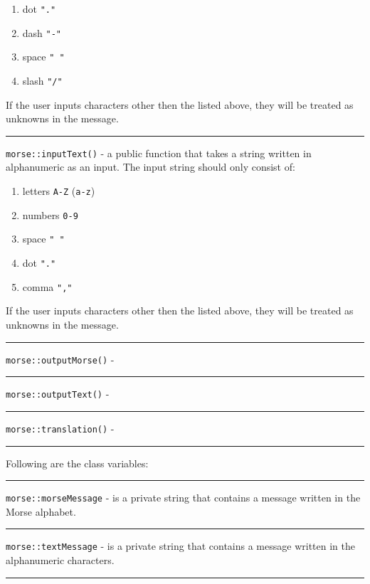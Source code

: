 \documentclass[12pt]{report}
\begin{document}
\begin{enumerate}
\item dot \verb|"."|

\item dash \verb|"-"|

\item space \verb|" "|

\item slash \verb|"/"|
\end{enumerate}

If the user inputs characters other then the listed above, they will be treated as unknowns in the message.

\rule{\textwidth}{0.5pt}


\verb|morse::inputText()| - a public function that takes a string written in alphanumeric as an input. The input string should only consist of:

\begin{enumerate}
\item letters \verb|A-Z| (\verb|a-z|)
\item numbers \verb|0-9|
\item space \verb|" "|
\item dot \verb|"."|
\item comma \verb|","|
\end{enumerate}

If the user inputs characters other then the listed above, they will be treated as unknowns in the message.

\rule{\textwidth}{0.5pt}

\verb|morse::outputMorse()| - 

\rule{\textwidth}{0.5pt}

\verb|morse::outputText()| - 

\rule{\textwidth}{0.5pt}

\verb|morse::translation()| - 

\rule{\textwidth}{0.5pt}



Following are the class variables:

\rule{\textwidth}{0.5pt}

\verb|morse::morseMessage| - is a private string that contains a message written in the Morse alphabet.

\rule{\textwidth}{0.5pt}

\verb|morse::textMessage| - is a private string that contains a message written in the alphanumeric characters.

\rule{\textwidth}{0.5pt}
\end{document}
